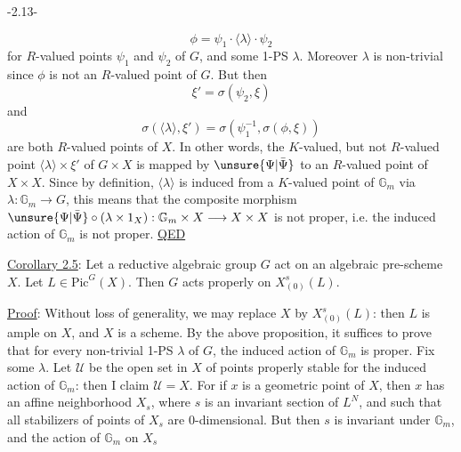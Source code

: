 \begin{center}-2.13-\end{center}
\[
\phi=\psi_1\cdot\langle\lambda\rangle\cdot\psi_2
\]
for $R$-valued points $\psi_1$ and $\psi_2$ of $G$, and some 1-PS $\lambda$. Moreover $\lambda$ is non-trivial since $\phi$ is not an $R$-valued point of $G$. But then
\[
\xi'=\sigma(\psi_2,\xi)
\]
and
\[
\sigma(\langle\lambda\rangle,\xi')=\sigma(\psi_1^{-1},\sigma(\phi,\xi))
\]
are both $R$-valued points of $X$. In other words, the $K$-valued, but not $R$-valued point $\langle\lambda\rangle\times\xi'$ of $G\times X$ is mapped by $\unsure{\Psi|\bar\Psi}$ to an $R$-valued point of $X\times X$. Since by definition, $\langle\lambda\rangle$ is induced from a $K$-valued point of $\mathbb G_m$ via $\lambda:\mathbb G_m\longrightarrow G$, this means that the composite morphism $\unsure{\Psi|\bar\Psi}\circ(\lambda\times1_X):\mathbb G_m\times X\longrightarrow X\times X$ is not proper, i.e. the induced action of $\mathbb G_m$ is not proper. \uline{QED}

\uline{Corollary 2.5}: Let a reductive algebraic group $G$ act on an algebraic pre-scheme $X$. Let $L\in\mathrm{Pic}^G(X)$. Then $G$ acts properly on $X^s_{(0)}(L)$.

\uline{Proof}: Without loss of generality, we may replace $X$ by $X^s_{(0)}(L)$: then $L$ is ample on $X$, and $X$ is a scheme. By the above proposition, it suffices to prove that for every non-trivial 1-PS $\lambda$ of $G$, the induced action of $\mathbb G_m$ is proper. Fix some $\lambda$. Let $\mathcal U$ be the open set in $X$ of points properly stable for the induced action of $\mathbb G_m$: then I claim $\mathcal U=X$. For if $x$ is a geometric point of $X$, then $x$ has an affine neighborhood $X_s$, where $s$ is an invariant section of $L^N$, and such that all stabilizers of points of $X_s$ are 0-dimensional. But then $s$ is invariant under $\mathbb G_m$, and the action of $\mathbb G_m$ on $X_s$
